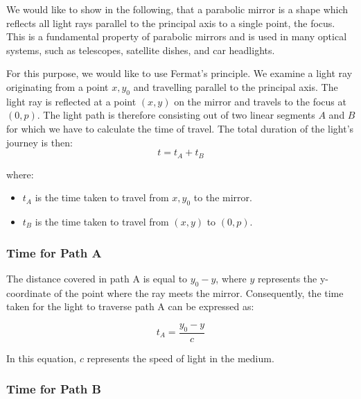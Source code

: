 \documentclass[
  a4paper,
]{book}
\providecommand{\tightlist}{%
  \setlength{\itemsep}{0pt}\setlength{\parskip}{0pt}}
\begin{document}
\begin{tcolorbox}[enhanced jigsaw, coltitle=black, title=\textcolor{quarto-callout-note-color}{\faInfo}\hspace{0.5em}{Parabolic Mirrors Focus Parallel Rays}, colframe=quarto-callout-note-color-frame, toprule=.15mm, opacitybacktitle=0.6, left=2mm, opacityback=0, breakable, toptitle=1mm, bottomtitle=1mm, leftrule=.75mm, arc=.35mm, titlerule=0mm, colbacktitle=quarto-callout-note-color!10!white, rightrule=.15mm, bottomrule=.15mm, colback=white]

We would like to show in the following, that a parabolic mirror is a
shape which reflects all light rays parallel to the principal axis to a
single point, the focus. This is a fundamental property of parabolic
mirrors and is used in many optical systems, such as telescopes,
satellite dishes, and car headlights.

For this purpose, we would like to use Fermat's principle. We examine a
light ray originating from a point \(x,y_0\) and travelling parallel to
the principal axis. The light ray is reflected at a point \((x,y)\) on
the mirror and travels to the focus at \((0,p)\). The light path is
therefore consisting out of two linear segments \(A\) and \(B\) for
which we have to calculate the time of travel. The total duration of the
light's journey is then: \[
t = t_A + t_B
\]

where:

\begin{itemize}
\tightlist
\item
  \(t_A\) is the time taken to travel from \(x,y_0\) to the mirror.
\item
  \(t_B\) is the time taken to travel from \((x,y)\) to \((0,p)\).
\end{itemize}

\subsubsection{Time for Path A}\label{time-for-path-a}

The distance covered in path A is equal to \(y_0 - y\), where \(y\)
represents the y-coordinate of the point where the ray meets the mirror.
Consequently, the time taken for the light to traverse path A can be
expressed as:

\[
t_A = \frac{y_0 - y}{c}
\]

In this equation, \(c\) represents the speed of light in the medium.

\subsubsection{Time for Path B}\label{time-for-path-b}


\end{tcolorbox}
\end{document}
